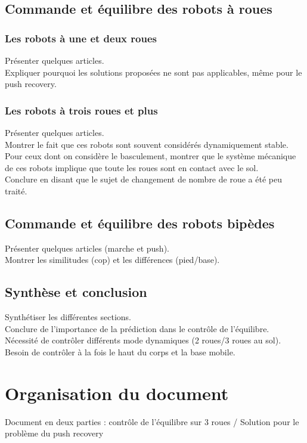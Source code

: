 \subsection{Commande et équilibre des robots à roues}
\subsubsection{Les robots à une et deux roues}

Présenter quelques articles.\\
Expliquer pourquoi les solutions proposées ne sont pas applicables, même pour le push recovery.

\subsubsection{Les robots à trois roues et plus}

Présenter quelques articles.\\
Montrer le fait que ces robots sont souvent considérés dynamiquement stable.\\
Pour ceux dont on considère le basculement, montrer que le système mécanique de ces robots implique que toute les roues sont en contact avec le sol.\\
Conclure en disant que le sujet de changement de nombre de roue a été peu traité.

\subsection{Commande et équilibre des robots bipèdes}

Présenter quelques articles (marche et push).\\
Montrer les similitudes (cop) et les différences (pied/base).

\subsection{Synthèse et conclusion}

Synthétiser les différentes sections.\\
Conclure de l'importance de la prédiction dans le contrôle de l'équilibre.\\
Nécessité de contrôler différents mode dynamiques (2 roues/3 roues au sol).\\
Besoin de contrôler à la fois le haut du corps et la base mobile.


\section{Organisation du document}

Document en deux parties : contrôle de l'équilibre sur 3 roues / Solution pour le problème du push recovery
